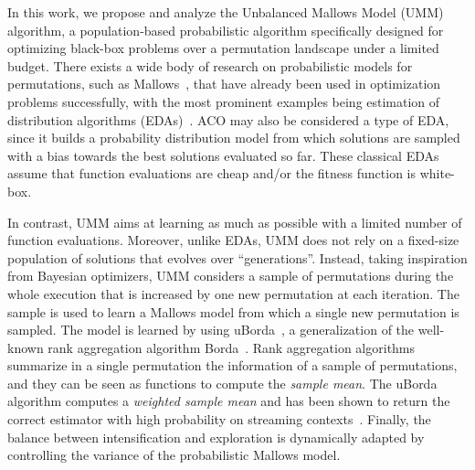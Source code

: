 \documentclass[sigconf,dvipsnames]{acmart}
\begin{document}
In this work, we propose and analyze the Unbalanced Mallows Model (UMM) algorithm, a
population-based probabilistic algorithm specifically designed for optimizing
black-box problems over a permutation landscape under a limited budget. There
exists a wide body of research on probabilistic models for permutations, such
as Mallows~\cite{FliVer1986}, that have already been  used in optimization
problems successfully, with the most prominent examples being estimation of
distribution algorithms
(EDAs)~\cite{CebIruMen2014eda}. ACO may also be considered
a type of EDA, since it builds a probability distribution model from which
solutions are sampled with a bias towards the best solutions evaluated so
far. These classical EDAs  assume that function
evaluations are cheap and/or the fitness function is white-box.%

In contrast, UMM aims at learning as much as possible with a limited number of
function evaluations. Moreover, unlike EDAs, UMM does not rely on a fixed-size
population of solutions that evolves over ``generations''. Instead, taking
inspiration from Bayesian optimizers, UMM considers a sample of permutations
during the whole execution that is increased by one new permutation at each
iteration. The sample is used to learn a Mallows model from which a single new
permutation is sampled. The model is learned by using
uBorda~\cite{IruLobPer2020arxiv}, a generalization of the well-known rank
aggregation algorithm Borda~\cite{AliMei2011kemeny}. Rank aggregation algorithms
summarize in a single permutation the information of a sample of permutations,
and they can be seen as functions to compute the \emph{sample mean}. The uBorda
algorithm computes a \textit{weighted sample mean} and has been shown to return
the correct estimator with high probability on streaming
contexts~\cite{IruLobPer2020arxiv}.
%
Finally, the balance between intensification and exploration is dynamically
adapted by controlling the variance of the probabilistic Mallows model.

\end{document}
